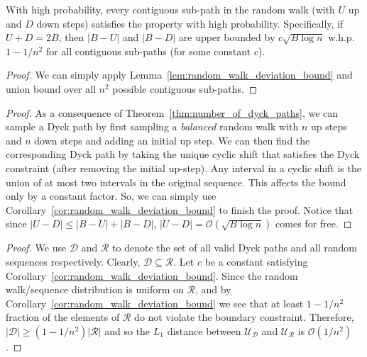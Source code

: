 \begin{corollary}
\label{cor:random_walk_deviation_bound}
With high probability, every contiguous sub-path in the random walk (with $U$ up and $D$ down steps) satisfies the property with high probability.
Specifically, if $U+D = 2B$, then $|B-U|$ and $|B-D|$ are upper bounded by $c\sqrt{B\log n}$ w.h.p. $1-1/n^2$
for all contiguous sub-paths (for some constant $c$).
\end{corollary}
\begin{proof}
We can simply apply Lemma~\ref{lem:random_walk_deviation_bound} and union bound over all $n^2$ possible contiguous sub-paths.
\end{proof}

\DyckPathDeviationBound*
\begin{proof}
As a consequence of Theorem~\ref{thm:number_of_dyck_paths}, we can sample a Dyck path
by first sampling a \emph{balanced} random walk with $n$ up steps and $n$ down steps and adding an initial up step.
We can then find the corresponding Dyck path by taking the unique cyclic shift that satisfies the Dyck constraint (after removing the initial up-step).
Any interval in a cyclic shift is the union of at most two intervals in the original sequence.
This affects the bound only by a constant factor.
So, we can simply use Corollary~\ref{cor:random_walk_deviation_bound} to finish the proof.
Notice that since $|U-D| \le |B-U|+|B-D|$, $|U-D| = \mathcal O(\sqrt{B\log n})$ comes for free.
\end{proof}

\DyckPathIrrelevantBoundary*
\begin{proof}
We use $\mathcal D$ and $\mathcal R$ to denote the set of all valid Dyck paths and all random sequences respectively.
Clearly, $\mathcal D\subseteq \mathcal R$. Let $c$ be a constant satisfying Corollary~\ref{cor:random_walk_deviation_bound}.
Since the random walk/sequence distribution is uniform on $\mathcal R$, and by Corollary~\ref{cor:random_walk_deviation_bound}
we see that at least $1-1/n^2$ fraction of the elements of $\mathcal R$ do not violate the boundary constraint.
Therefore, $|\mathcal D|\ge (1-1/n^2)|\mathcal R|$ and so the $L_1$ distance between
$\mathcal U_{\mathcal D}$ and $\mathcal U_{\mathcal R}$ is $\mathcal O(1/n^2)$.
\end{proof}



